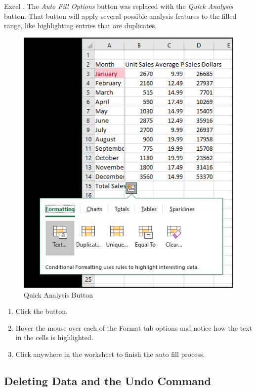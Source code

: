 Excel . The \textit{Auto Fill Options} button was replaced with the \textit{Quick Analysis} button. That button will apply several possible analysis features to the filled range, like highlighting entries that are duplicates.

\begin{figure}[H]
	\centering
	\includegraphics[width=\maxwidth{.95\linewidth}]{gfx/ch01_fig20a}
	\caption{Quick Analysis Button}
	\label{01:fig20a}
\end{figure}

\begin{enumerate}
	\item Click the  button.
	\item Hover the mouse over each of the Format tab options and notice how the text in the cells is highlighted.
	\item Click anywhere in the worksheet to finish the auto fill process.
\end{enumerate}

\subsection{Deleting Data and the Undo Command}


